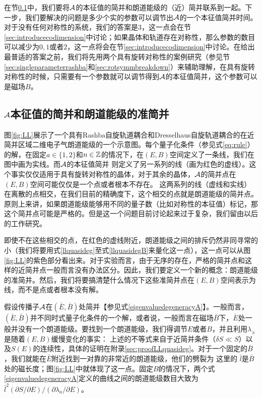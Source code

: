 在节\ref{sec:relatedegeneracies}中，我们要将${\cal A}$的本征值的简并和朗道能级的（近）简并联系到一起。下一步，我们要解决的问题是多少个实的参数可以调节出${\cal A}$的一个本征值简并时间。对于没有任何对称性的系统，我们的答案是$3$，这一点会在节\ref{sec:introducecodimension}中讨论；如果晶体和轨道存在对称性，那么参数的数目可以减少为$0,1$或者$2$，这一点将会在节\ref{sec:introducecodimension}中讨论。在给出最普适的答案之前，我们将先用两个具有旋转对称性的案例研究（参见节\ref{sec:singleparameterrashba}和\ref{sec:rotsymmbreakdown}）来辅助理解，在具有旋转对称性的时候，只需要有一个参数就可以调节得到${\cal A}$的本征值简并，这个参数可以是磁场$B$。

\subsection{${\cal A}$本征值的简并和朗道能级的准简并}\label{sec:relatedegeneracies}


图\ref{fig:LL}展示了一个具有Rashba自旋轨道耦合和Dresselhaus自旋轨道耦合的在近简并区域二维电子气朗道能级的一个示意图。每个量子化条件（参见式\ref{eq:rule}）的解，在固定$a\in \{1,2\}$和$n \in \mathbb{Z}$的情况下，在$(E,B)$空间定义了一条线，我们在图中画为实线。而${\cal A}$的本征值简并
则定义了另一系列的线（画为红色的虚线）。这个事实仅仅适用于具有旋转对称性的晶体，对于其余的晶体，${\cal A}$的简并点在$(E,B)$空间可能仅仅是一个点或者根本不存在。 这两系列的线（虚线和实线）在离散的点相交，在我们目前的精确度下，这个相交的点就是朗道能级的简并点。原则上来讲，如果朗道能级能够用不同的量子数（比如对称性的本征值）标记，那这个简并点可能是严格的。但是这一个问题目前讨论起来过于复杂，我们留由以后的工作研究。

即使不在这些相交的点，在红色的虚线附近，朗道能级之间的排斥仍然非同寻常的小（我们将要用式\ref{llquasideg}至式\ref{llquasidegB}来量化这一点），这一点可以从图\ref{fig:LL}的紫色部分看出来。对于实验而言，由于无序的存在，严格的简并点和这样的近简并点一般而言没有办法区分\cite{shoenberg_magnetic_2009}。因此，我们要定义一个新的概念：朗道能级的准简并。然后，我们将要搞清楚什么情况下这些准简并点在$(E,B)$空间表示为线，而不是点或者根本没有解。


假设传播子${\cal A}$在$(\bar{E},\bar{B})$处简并【参见式\ref{eigenvaluedegeneracyA}】。一般而言，$(\bar{E},\bar{B})$并不同时式量子化条件的一个解，或者说，一般而言在磁场$\bar{B}$下，$\bar{E}$处一般并没有一个朗道能级。要找到一个朗道能级，我们得调节$E$或者$B$，并且利用$\lambda_{\pm}$是随着$(E,B)$缓慢变化的事实：
上述的不等式来自于近简并条件（$\delta S{\ll}S$）以及$S(E)$的连续性，具体的证明在附录\ref{sec:proofLLquasideg}。对于一个固定的$\bar{B}$，我们就能在$\bar{E}$附近找到一对靠的非常近的朗道能级，他们的劈裂为
这里的 $\bar{l}$是$\bar{B}$处的磁长度；图\ref{fig:LL}中就体现了这一点。固定$B$的情况下，两个式\ref{eigenvaluedegeneracyA}定义的曲线之间的朗道能级数目大致为$\bar{l}^2(\partial S/\partial E)/(\partial \lambda_a/\partial E)$。

